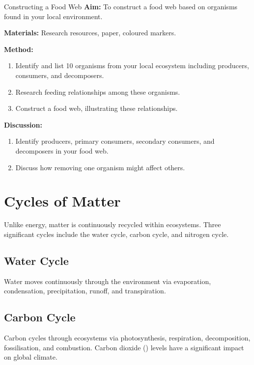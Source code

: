 \begin{investigation}{Constructing a Food Web}
\textbf{Aim:} To construct a food web based on organisms found in your local environment.

\textbf{Materials:} Research resources, paper, coloured markers.

\textbf{Method:}
\begin{enumerate}
    \item Identify and list 10 organisms from your local ecosystem including producers, consumers, and decomposers.
    \item Research feeding relationships among these organisms.
    \item Construct a food web, illustrating these relationships.
\end{enumerate}

\textbf{Discussion:}
\begin{enumerate}
    \item Identify producers, primary consumers, secondary consumers, and decomposers in your food web.
    \item Discuss how removing one organism might affect others.
\end{enumerate}
\end{investigation}

\section{Cycles of Matter}

Unlike energy, matter is continuously recycled within ecosystems. Three significant cycles include the water cycle, carbon cycle, and nitrogen cycle.

\subsection{Water Cycle}

Water moves continuously through the environment via evaporation, condensation, precipitation, runoff, and transpiration.

\subsection{Carbon Cycle}

Carbon cycles through ecosystems via photosynthesis, respiration, decomposition, fossilisation, and combustion. Carbon dioxide () levels have a significant impact on global climate.

